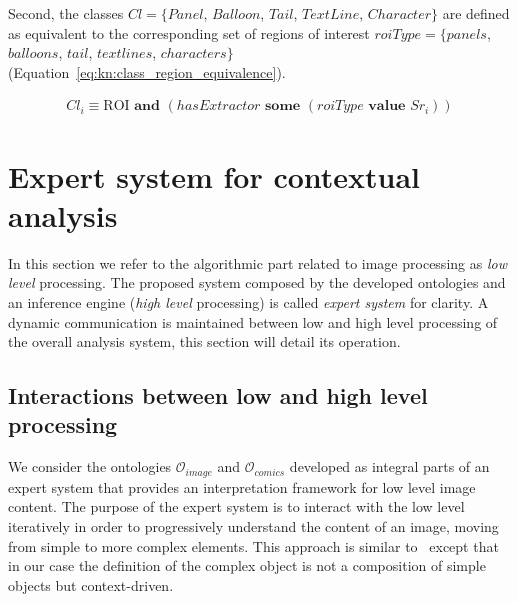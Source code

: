 Second, the classes $Cl=\{Panel$, $Balloon$, $Tail$, $TextLine$, $Character\}$ are defined as equivalent to the corresponding set of regions of interest $roiType = \{panels$, $balloons$, $tail$, $text lines$, $characters\}$ (Equation~\ref{eq:kn:class_region_equivalence}).%
  

\begin{equation}
\label{eq:kn:class_region_equivalence}
\begin{split}
Cl_i  \equiv \text{ROI} \textbf{ and } (hasExtractor \textbf{ some } (roiType \textbf{ value } Sr_i ))
\end{split}
\end{equation}



\section{Expert system for contextual analysis} %
\label{sec:kn:expert_system}

In this section we refer to the algorithmic part related to image processing as \emph{low level} processing. 
The proposed system composed by the developed ontologies and an inference engine (\emph{high level} processing) is called \emph{expert system} for clarity.
A dynamic communication is maintained between low and high level processing of the overall analysis system, this section will detail its operation.


\subsection{Interactions between low and high level processing} %
\label{sub:interactions_between_low_and_high_level_processing}


We consider the ontologies $\mathcal{O}_{image}$ and $\mathcal{O}_{comics}$ developed as integral parts of an expert system that provides an interpretation framework for low level image content.
The purpose of the expert system is to interact with the low level iteratively in order to progressively understand the content of an image, moving from simple to more complex elements.
This approach is similar to~\cite{Sciascio2011Structured} except that in our case the definition of the complex object is not a composition of simple objects but context-driven.

